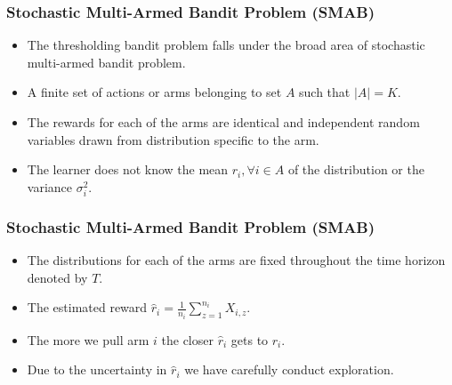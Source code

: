 \begin{frame}
\frametitle{Stochastic Multi-Armed Bandit Problem (SMAB)}
\begin{itemize}
\item<1-> The thresholding bandit problem falls under the broad area of stochastic multi-armed bandit problem.
\item<2-> A finite set of actions or arms belonging to set $A$ such that $|A|=K$. 
\item<3-> The rewards for each of the arms are identical and independent random variables drawn from distribution specific to the arm.
\item<4-> The learner does not know the mean $r_{i},\forall i\in A$ of the distribution or the variance $\sigma_i^2$. 
\end{itemize}
\end{frame}

\begin{frame}
\frametitle{Stochastic Multi-Armed Bandit Problem (SMAB)}
\begin{itemize}
\item<1-> The distributions for each of the arms are fixed throughout the time horizon denoted by $T$. 
\item<2-> The estimated reward $\hat{r}_{i}=\frac{1}{n_{i}}\sum_{z=1}^{n_i} X_{i,z}$.
\item<3-> The more we pull arm $i$ the closer $\hat{r}_i$ gets to $r_i$.
\item<4-> Due to the uncertainty in $\hat{r}_i$ we have carefully conduct exploration.
\end{itemize}
\end{frame}


